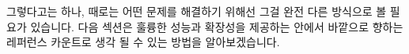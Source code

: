 그렇다고는 하나, 때로는 어떤 문제를 해결하기 위해선 그걸 완전 다른 방식으로 볼
필요가 있습니다.
다음 섹션은 훌륭한 성능과 확장성을 제공하는 안에서 바깥으로 향하는 레퍼런스
카운트로 생각 될 수 있는 방법을 알아보겠습니다.

